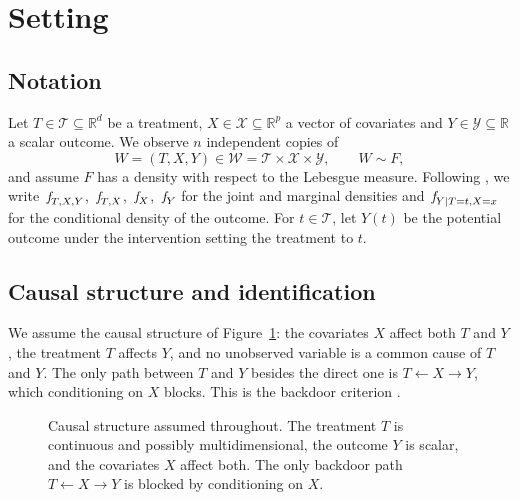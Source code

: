\documentclass[11pt]{article}
\theoremstyle{plain}
\theoremstyle{definition}
\theoremstyle{remark}
\newcommand{\R}{\mathbb{R}}
\newcommand{\cW}{\ensuremath{\mathcal{W}}}
\newcommand{\cX}{\ensuremath{\mathcal{X}}}
\newcommand{\cY}{\ensuremath{\mathcal{Y}}}
\newcommand{\cT}{\ensuremath{\mathcal{T}}}
\newcommand{\pf}[1]{\ensuremath{\,\mathlarger{\textit{f}}_{#1}}}
\begin{document}
\section{Setting}
\label{sec:setting}

\subsection{Notation}
\label{sec:setting-notation}

Let $T \in \cT \subseteq \R^{d}$ be a treatment, $X \in \cX \subseteq \R^{p}$ a vector of
covariates and $Y \in \cY \subseteq \R$ a scalar outcome. We observe $n$ independent
copies of
\[
W = (T,X,Y) \in \cW = \cT \times \cX \times \cY , \qquad W \sim F,
\]
and assume $F$ has a density with respect to the Lebesgue measure. Following
\citet{meziani2025mcd}, we write $\pf{T,X,Y}$, $\pf{T,X}$, $\pf{X}$, $\pf{Y}$ for the
joint and marginal densities and $\pf{Y \mid T=t,X=x}$ for the conditional density of the
outcome. For $t \in \cT$, let $Y(t)$ be the potential outcome under the intervention
setting the treatment to $t$.

\subsection{Causal structure and identification}
\label{sec:setting-id}

We assume the causal structure of Figure~\ref{fig:dag}: the covariates $X$ affect both
$T$ and $Y$, the treatment $T$ affects $Y$, and no unobserved variable is a common cause
of $T$ and $Y$. The only path between $T$ and $Y$ besides the direct one is
$T \leftarrow X \rightarrow Y$, which conditioning on $X$ blocks. This is the backdoor
criterion \citep{pearl2009}.

\begin{figure}[htbp]
    \centering
    \caption{Causal structure assumed throughout. The treatment $T$ is continuous and
    possibly multidimensional, the outcome $Y$ is scalar, and the covariates $X$ affect
    both. The only backdoor path $T \leftarrow X \rightarrow Y$ is blocked by
    conditioning on $X$.}
    \label{fig:dag}
\end{figure}
\end{document}
